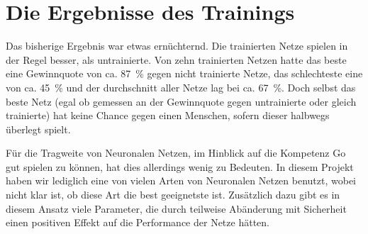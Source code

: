\section{Die Ergebnisse des Trainings}
Das bisherige Ergebnis war etwas ernüchternd. Die trainierten Netze spielen in
der Regel besser, als untrainierte. Von zehn trainierten Netzen hatte das beste
eine Gewinnquote von ca. \SI{87}{\percent} gegen nicht trainierte Netze, das
schlechteste eine von ca. \SI{45}{\percent} und der durchschnitt aller Netze
lag bei ca. \SI{67}{\percent}.  Doch selbst das beste Netz (egal ob gemessen an
der Gewinnquote gegen untrainierte oder gleich trainierte) hat keine Chance
gegen einen Menschen, sofern dieser halbwegs überlegt spielt.

Für die Tragweite von Neuronalen Netzen, im Hinblick auf die Kompetenz Go gut
spielen zu können, hat dies allerdings wenig zu Bedeuten. In diesem Projekt
haben wir lediglich eine von vielen Arten von Neuronalen Netzen benutzt, wobei
nicht klar ist, ob diese Art die best geeignetste ist. Zusätzlich dazu gibt es
in diesem Ansatz viele Parameter, die durch teilweise Abänderung mit Sicherheit
einen positiven Effekt auf die Performance der Netze hätten. 
